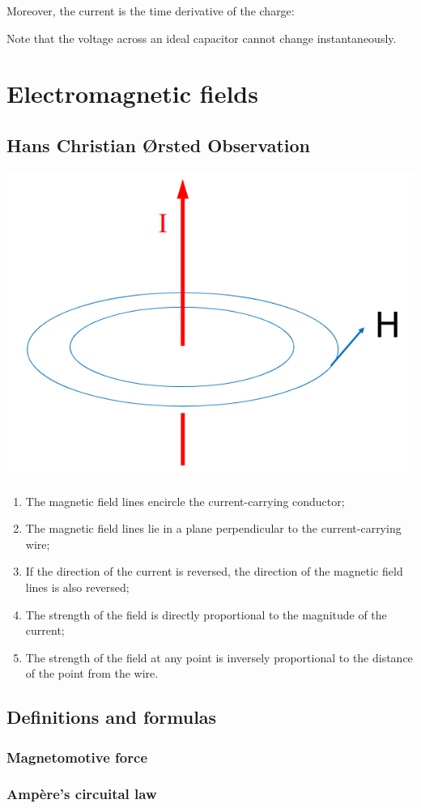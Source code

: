 \documentclass{article}
\begin{document}
Moreover, the current is the time derivative of the charge:

Note that the voltage across an ideal capacitor cannot change instantaneously.

\newpage
\section{Electromagnetic fields}
\subsection{Hans Christian Ørsted Observation}
\begin{center}
    \includegraphics[width=.4\textwidth]{media/observations.png}
\end{center}
\begin{enumerate}
    \item The magnetic field lines encircle the current-carrying conductor;
    \item The magnetic field lines lie in a plane perpendicular to the current-carrying wire;
    \item If the direction of the current is reversed, the direction of the magnetic field lines is also reversed;
    \item The strength of the field is directly proportional to the magnitude of the current;
    \item The strength of the field at any point is inversely proportional to the distance of the point from the wire.
\end{enumerate}

\subsection{Definitions and formulas}
\subsubsection{Magnetomotive force}

\subsubsection{Ampère's circuital law}
\end{document}
